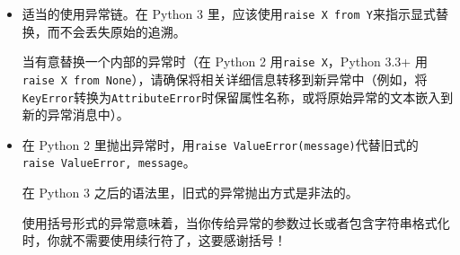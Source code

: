 \documentclass[ignorenonframetext,9pt]{beamer}
\begin{document}
\begin{frame}[fragile]
\begin{itemize}
\item
  适当的使用异常链。在 Python 3
  里，应该使用\texttt{raise\ X\ from\ Y}来指示显式替换，而不会丢失原始的追溯。

  当有意替换一个内部的异常时（在 Python 2 用\texttt{raise\ X}，Python
  3.3+
  用\texttt{raise\ X\ from\ None}），请确保将相关详细信息转移到新异常中（例如，将\texttt{KeyError}转换为\texttt{AttributeError}时保留属性名称，或将原始异常的文本嵌入到新的异常消息中）。
\end{itemize}

\end{frame}

\begin{frame}[fragile]

\begin{itemize}
\item
  在 Python 2
  里抛出异常时，用\texttt{raise\ ValueError(\textquotesingle{}message\textquotesingle{})}代替旧式的\texttt{raise\ ValueError,\ \textquotesingle{}message\textquotesingle{}}。

  在 Python 3 之后的语法里，旧式的异常抛出方式是非法的。

  使用括号形式的异常意味着，当你传给异常的参数过长或者包含字符串格式化时，你就不需要使用续行符了，这要感谢括号！
\end{itemize}

\end{frame}
\end{document}

